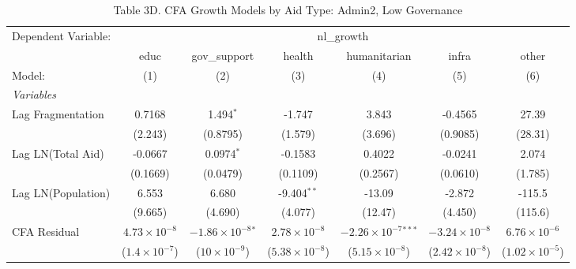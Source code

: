 \begin{table}[htbp]
   \caption{Table 3D. CFA Growth Models by Aid Type: Admin2, Low Governance}
   \centering
   \begin{tabular}{lcccccc}
      \tabularnewline \midrule \midrule
      Dependent Variable: & \multicolumn{6}{c}{nl\_growth}\\
                         & educ                   & gov\_support                 & health                  & humanitarian                   & infra                   & other \\   
      Model:             & (1)                    & (2)                          & (3)                     & (4)                            & (5)                     & (6)\\  
      \midrule
      \emph{Variables}\\
      Lag Fragmentation  & 0.7168                 & 1.494$^{*}$                  & -1.747                  & 3.843                          & -0.4565                 & 27.39\\   
                         & (2.243)                & (0.8795)                     & (1.579)                 & (3.696)                        & (0.9085)                & (28.31)\\   
      Lag LN(Total Aid)  & -0.0667                & 0.0974$^{*}$                 & -0.1583                 & 0.4022                         & -0.0241                 & 2.074\\   
                         & (0.1669)               & (0.0479)                     & (0.1109)                & (0.2567)                       & (0.0610)                & (1.785)\\   
      Lag LN(Population) & 6.553                  & 6.680                        & -9.404$^{**}$           & -13.09                         & -2.872                  & -115.5\\   
                         & (9.665)                & (4.690)                      & (4.077)                 & (12.47)                        & (4.450)                 & (115.6)\\   
      CFA Residual       & $4.73\times 10^{-8}$   & $-1.86\times 10^{-8}$$^{*}$  & $2.78\times 10^{-8}$    & $-2.26\times 10^{-7}$$^{***}$  & $-3.24\times 10^{-8}$   & $6.76\times 10^{-6}$\\    
                         & ($1.4\times 10^{-7}$)  & ($10\times 10^{-9}$)         & ($5.38\times 10^{-8}$)  & ($5.15\times 10^{-8}$)         & ($2.42\times 10^{-8}$)  & ($1.02\times 10^{-5}$)\\    

\end{tabular}
\end{table}
